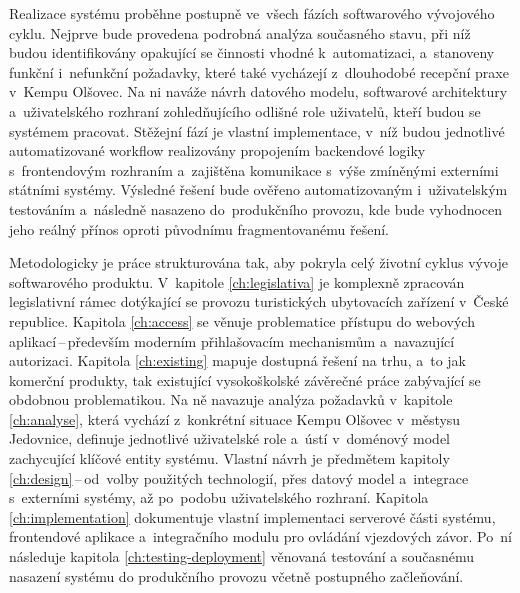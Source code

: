 Realizace systému proběhne postupně ve~všech fázích softwarového vývojového cyklu.
Nejprve bude provedena podrobná analýza současného stavu, při níž budou identifikovány opakující se činnosti vhodné k~automatizaci, a~stanoveny funkční i~nefunkční požadavky, které také vycházejí z~dlouhodobé recepční praxe v~Kempu Olšovec.
Na ni naváže návrh datového modelu, softwarové architektury a~uživatelského rozhraní zohledňujícího odlišné role uživatelů, kteří budou se systémem pracovat.
Stěžejní fází je vlastní implementace, v~níž budou jednotlivé automatizované workflow realizovány propojením backendové logiky s~frontendovým rozhraním a~zajištěna komunikace s~výše zmíněnými externími státními systémy.
Výsledné řešení bude ověřeno automatizovaným i~uživatelským testováním a~následně nasazeno do~produkčního provozu, kde bude vyhodnocen jeho reálný přínos oproti původnímu fragmentovanému řešení.

Metodologicky je práce strukturována tak, aby pokryla celý životní cyklus vývoje softwarového produktu.
V~kapitole \ref{ch:legislativa} je komplexně zpracován legislativní rámec dotýkající se provozu turistických ubytovacích zařízení v~České republice.
Kapitola \ref{ch:access} se věnuje problematice přístupu do webových aplikací\,--\,především moderním přihlašovacím mechanismům a~navazující autorizaci.
Kapitola \ref{ch:existing} mapuje dostupná řešení na trhu, a~to jak komerční produkty, tak existující vysokoškolské závěrečné práce zabývající se obdobnou problematikou.
Na ně navazuje analýza požadavků v~kapitole \ref{ch:analyse}, která vychází z~konkrétní situace Kempu Olšovec v~městysu Jedovnice, definuje jednotlivé uživatelské role a~ústí v~doménový model zachycující klíčové entity systému.
Vlastní návrh je předmětem kapitoly \ref{ch:design}\,--\,od~volby použitých technologií, přes datový model a~integrace s~externími systémy, až po~podobu uživatelského rozhraní.
Kapitola \ref{ch:implementation} dokumentuje vlastní implementaci serverové části systému, frontendové aplikace a~integračního modulu pro ovládání vjezdových závor.
Po~ní následuje kapitola \ref{ch:testing-deployment} věnovaná testování a současnému nasazení systému do produkčního provozu včetně postupného začleňování.

